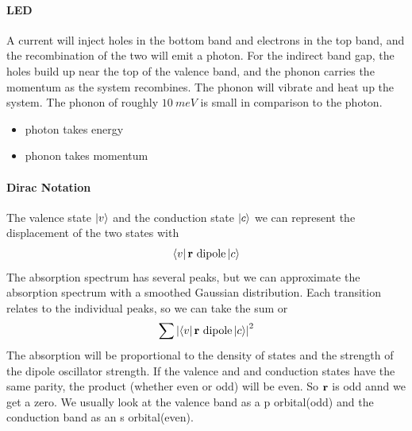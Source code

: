 \documentclass[../main.tex]{subfiles}
\begin{document}
\paragraph*{LED} A current will inject holes in the bottom band and electrons in the top band, and 
the recombination of the two will emit a photon. For the indirect band gap, the holes build up near
the top of the valence band, and the phonon carries the momentum as the system recombines. The 
phonon will vibrate and heat up the system. The phonon of roughly $\qty{10}{meV}$ is small in 
comparison to the photon. 
\begin{itemize}
    \item photon takes energy
    \item phonon takes momentum
\end{itemize}
\paragraph*{Dirac Notation} The valence state $\ket{v}$ and the conduction state $\ket{c}$ we can 
represent the displacement of the two states with
\begin{align*}
    \bra{v}{\vb r \text{ dipole}} \ket{c}
\end{align*}
The absorption spectrum has several peaks, but we can approximate the absorption spectrum with a
smoothed Gaussian distribution. Each transition relates to the individual peaks, so we can take the
sum or
\begin{align*}
    \sum \abs{\bra{v}{\vb r \text{ dipole}} \ket{c}}^2
\end{align*}
The absorption will be proportional to the density of states and the strength of the dipole 
oscillator strength. If the valence and and conduction states have the same parity, the product
(whether even or odd) will be even. So $\vb r$ is odd annd we get a zero. We usually look at the
valence band as a p orbital(odd) and the conduction band as an s orbital(even). 

\newpage
\end{document}
